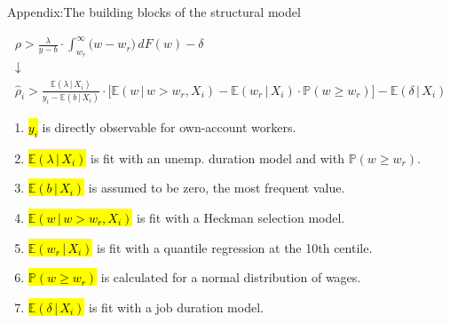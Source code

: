 \begin{frame}{Appendix:}{The building blocks of the structural model}

\begin{gather*}
\rho > \frac{\lambda}{y - b} \cdot \int_{w_r}^{\infty} \big( w - w_r \big) \, dF(w) - \delta \\
\downarrow \\
\hat{\rho}_i > \frac{\mathbb{E} \left( \lambda \,|\, X_i \right)}{y_i - \mathbb{E} \left( b \,|\, X_i \right)} \cdot \Big[ \mathbb{E}\left( w \,|\, w > w_r, X_i \right) - \mathbb{E} \left( w_r \,|\, X_i \right) \cdot \mathbb{P}(w \geq w_r) \Big] - \mathbb{E} \left( \delta \,|\, X_i \right)
\end{gather*}

\begin{enumerate}
\item \hl{$y_i$} is directly observable for own-account workers. 
\item \hl{$\mathbb{E} \left(\lambda \,|\, X_i \right)$} is fit with an unemp. duration model and with $\mathbb{P} (w \geq w_r)$. 
\item \hl{$\mathbb{E} \left(b \,|\, X_i \right)$} is assumed to be zero, the most frequent value. 
\item \hl{$\mathbb{E} \left( w \,|\, w > w_r, X_i \right)$} is fit with a Heckman selection model.  
\item \hl{$\mathbb{E} \left( w_r \,|\, X_i \right)$} is fit with a quantile regression at the 10th centile. 
\item \hl{$\mathbb{P} (w \geq w_r)$} is calculated for a normal distribution of wages. 
\item \hl{$\mathbb{E} \left(\delta \,|\, X_i \right)$} is fit with a job duration model.
\end{enumerate}

\end{frame} %

